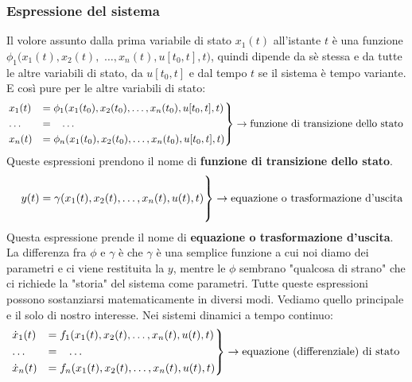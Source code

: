 \subsubsection{Espressione del sistema}
Il volore assunto dalla prima variabile di stato $x_1(t)$ all'istante $t$ è una funzione $\phi_1(x_1(t),x_2(t),$ $\dots, x_n(t), u[t_0,t], t)$, quindi dipende da sè stessa e da tutte le altre variabili di stato, da  $u[t_0,t]$ e dal tempo $t$ se il sistema è tempo variante. E così pure per le altre variabili di stato:
\[
    \begin{rcases}
        x_1(t) &= \phi_1(x_1(t_0),x_2(t_0), \dots, x_n(t_0), u[t_0,t], t)\\
        \dots \;\;\;&= \;\;\;\dots\\
        x_n(t) &= \phi_n(x_1(t_0),x_2(t_0), \dots, x_n(t_0), u[t_0,t], t)
    \end{rcases} \rightarrow \text{funzione di transizione dello stato}\;
\]
Queste espressioni prendono il nome di \textbf{funzione di transizione dello stato}.
\[
    \begin{rcases}
        \\
        \;\;\;\; y(t) = \gamma(x_1(t),x_2(t), \dots, x_n(t), u(t), t)\\
        \\
    \end{rcases} \rightarrow \text{equazione o trasformazione d'uscita}\;
\]
Questa espressione prende il nome di \textbf{equazione o trasformazione d'uscita}.\newline
\newline
La differenza fra $\phi$ e $\gamma$ è che $\gamma$ è una semplice funzione a cui noi diamo dei parametri e ci viene restituita la $y$, mentre le $\phi$ sembrano "qualcosa di strano" che ci richiede la "storia" del sistema come parametri.\newline
\newline
Tutte queste espressioni possono sostanziarsi matematicamente in diversi modi. Vediamo quello principale e il solo di nostro interesse.\newline
\newline
Nei sistemi dinamici a tempo continuo:
\[
    \begin{rcases}
        \dot{x}_1(t) &= f_1(x_1(t),x_2(t), \dots, x_n(t), u(t), t)\\
        \dots \;\;\;&= \;\;\;\dots\\
        \dot{x}_n(t) &= f_n(x_1(t),x_2(t), \dots, x_n(t), u(t), t)
    \end{rcases} \rightarrow \text{equazione (differenziale) di stato}\;
\]
